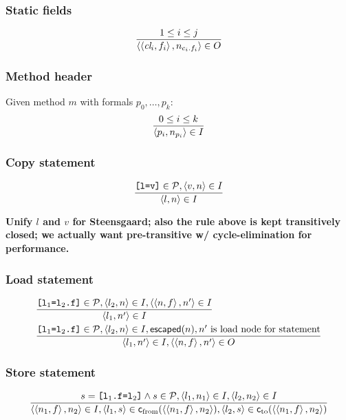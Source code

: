 \documentclass[11pt,notitlepage]{article}
\newcommand{\bigvar}[1]{\ensuremath{\text{\it #1}}}
\newcommand{\func}[1]{\ensuremath{\text{\sffamily #1}}}
\begin{document}
\subsubsection{Static fields}

\begin{displaymath}
\dfrac{1\leq i \leq j}{\tuple{\tuple{\bigvar{cl}_i,f_i},n_{c_i.f_i}}\in O}
\end{displaymath}

\subsubsection{Method header}
Given method $m$ with formals $p_0,\ldots,p_k$:
\begin{displaymath}
\dfrac{0\leq i \leq k}{\left\langle p_i, n_{p_i} \right\rangle\in I}
\end{displaymath}

\subsubsection{Copy statement}

\begin{displaymath}
\dfrac
{\text{\tt [l=v]}\in\mathcal{P}, \left\langle v,n \right\rangle\in I}
{\left\langle l,n \right\rangle\in I}
\end{displaymath}

\textbf{Unify $l$ and $v$ for Steensgaard;  also the rule above is
  kept transitively closed; we actually want pre-transitive w/
  cycle-elimination for performance.}

\subsubsection{Load statement}

\begin{eqnarray*}
&
\dfrac
{\text{\tt [l$_1$=l$_2$.f]}\in\mathcal{P},
 \tuple{l_2,n}\in I,
 \tuple{\tuple{n,f},n'}\in I}
{\tuple{l_1,n'}\in I}
\\&
\dfrac
{\text{\tt [l$_1$=l$_2$.f]}\in\mathcal{P},
 \tuple{l_2,n}\in I,
 \func{escaped}(n),
 n' \text{ is load node for statement} }
{\tuple{l_1,n'}\in I, \tuple{\tuple{n,f},n'}\in O}
\end{eqnarray*}

\subsubsection{Store statement}

\begin{displaymath}
\dfrac
{s=\text{\tt [l$_1$.f=l$_2$]}\wedge s\in\mathcal{P},
 \tuple{l_1,n_1}\in I,
 \tuple{l_2,n_2}\in I }
{\tuple{\tuple{n_1,f},n_2}\in I,
 \tuple{l_1,s}\in\func{c}_\text{from}(\tuple{\tuple{n_1,f},n_2}),
 \tuple{l_2,s}\in\func{c}_\text{to}(\tuple{\tuple{n_1,f},n_2}) }
\end{displaymath}
\end{document}

